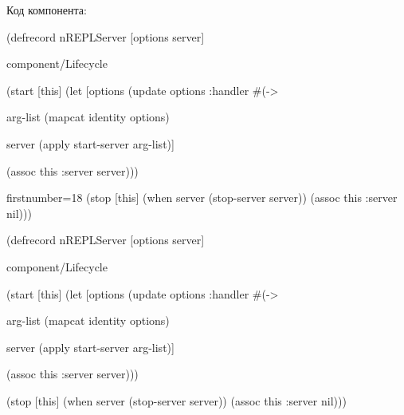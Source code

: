 \begin{english}
  \begin{clojure}
  \end{clojure}
\end{english}

Код компонента:

\iflarge

\begin{english}
  \begin{clojure/lines}
(defrecord nREPLServer
    [options
     server]

  component/Lifecycle

  (start [this]
    (let [options
          (update options :handler #(-> %

          arg-list
          (mapcat identity options)

          server
          (apply start-server arg-list)]

      (assoc this :server server)))
  \end{clojure/lines}
\end{english}

\pagebreak[4]

\begin{english}
  \begin{clojure/lines*}{firstnumber=18}
  (stop [this]
    (when server
      (stop-server server))
    (assoc this :server nil)))
  \end{clojure/lines*}
\end{english}

\else

\begin{english}
  \begin{clojure/lines}
(defrecord nREPLServer
    [options
     server]

  component/Lifecycle

  (start [this]
    (let [options
          (update options :handler #(-> %

          arg-list
          (mapcat identity options)

          server
          (apply start-server arg-list)]

      (assoc this :server server)))

  (stop [this]
    (when server
      (stop-server server))
    (assoc this :server nil)))
  \end{clojure/lines}
\end{english}

